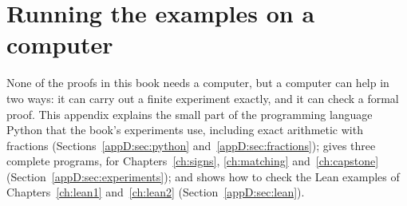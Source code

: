 \chapter{Running the examples on a computer}\label{app:practical}
None of the proofs in this book needs a computer, but a computer can help in two ways: it can carry out a finite experiment exactly, and it can check a formal proof. This appendix explains the small part of the programming language Python that the book's experiments use, including exact arithmetic with fractions (Sections~\ref{appD:sec:python} and~\ref{appD:sec:fractions}); gives three complete programs, for Chapters~\ref{ch:signs}, \ref{ch:matching} and~\ref{ch:capstone} (Section~\ref{appD:sec:experiments}); and shows how to check the Lean examples of Chapters~\ref{ch:lean1} and~\ref{ch:lean2} (Section~\ref{appD:sec:lean}).




